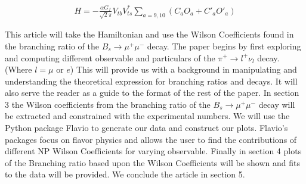 \documentclass[12pt]{article}
\def \bea{\begin{eqnarray}}
\def \eea{\end{eqnarray}}
\begin{document}
\begin{center}
\bea
H = -\frac{\alpha G_f}{\sqrt{2}\pi} V_{tb}V^*_{ts}\sum_{a= 9,10}^{}(C_aO_a + C'_aO'_a)
\eea
\end{center}
This article will take the Hamiltonian and use the Wilson Coefficients found in the branching ratio of the $B_s \rightarrow \mu^+ \mu^- $ decay. The paper begins by first exploring and computing different observable and particulars of the $\pi^+ \rightarrow l^+ \nu_l $ decay. (Where $l= \mu$ or $e$) This will provide us with a background in manipulating and understanding the theoretical expression for branching ratios and decays. It will also serve the reader as a guide to the format of the rest of the paper. In section 3 the Wilson coefficients from the branching ratio of the $B_s \rightarrow \mu^+\mu^-$ decay will be extracted and constrained with the experimental numbers. We will use the Python package Flavio\cite{flavio} to generate our data and construct our plots. Flavio's packages focus on flavor physics and allows the user to find the contributions of different NP Wilson Coefficients for varying observable. Finally in section 4 plots of the Branching ratio based upon the Wilson Coefficients will be shown and fits to the data will be provided. We conclude the article in section 5. 
\end{document}

